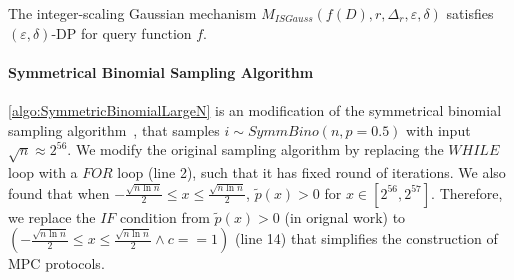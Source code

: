     \begin{theorem}
        The integer-scaling Gaussian mechanism $M_{ISGauss}\left(f\left(D\right),r,\Delta_r,\varepsilon,\delta\right)$ satisfies $ \left(\varepsilon,\delta\right) $-DP for query function $f$.
    \end{theorem}



    \paragraph{Symmetrical Binomial Sampling Algorithm}
    \label{para:BinarySearchBasedGeometricSamplingAlgorithm}

    \autoref{algo:SymmetricBinomialLargeN} is an modification of the symmetrical binomial sampling algorithm~\cite{googleDP2019}, that samples $i\sim SymmBino\left(n,p=0.5\right) $ with input $\sqrt{n}\approx 2^{56}$. We modify the original sampling algorithm by replacing the $WHILE$ loop with a $FOR$ loop (line 2), such that it has fixed round of iterations. We also found that when $-\frac{\sqrt{n\ln n}}{2} \leq x \leq \frac{\sqrt{n\ln n}}{2}$, $\tilde{p}\left(x\right)>0$ for $x \in [2^{56},2^{57}]$. Therefore, we replace the $IF$ condition from $\tilde{p}\left(x\right)>0$ (in orignal work) to $\left(-\frac{\sqrt{n\ln n}}{2} \leq x \leq \frac{\sqrt{n\ln n}}{2} \land c==1\right) $ (line 14) that simplifies the construction of MPC protocols.

